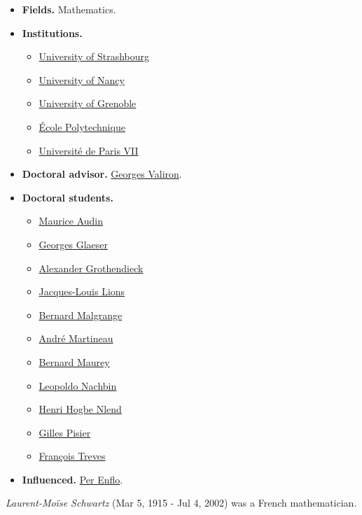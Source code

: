 \documentclass{article}
\begin{document}
\begin{itemize}
	\item \textbf{Fields.} Mathematics.
	\item \textbf{Institutions.}
	\begin{itemize}
		\item \href{https://en.wikipedia.org/wiki/University_of_Strasbourg}{University of Strashbourg}
		\item \href{https://en.wikipedia.org/wiki/University_of_Nancy}{University of Nancy}
		\item \href{https://en.wikipedia.org/wiki/University_of_Grenoble}{University of Grenoble}
		\item \href{https://en.wikipedia.org/wiki/%C3%89cole_Polytechnique}{\'Ecole Polytechnique}
		\item \href{https://en.wikipedia.org/wiki/Universit%C3%A9_de_Paris_VII}{Universit\'e de Paris VII}
	\end{itemize}
	\item \textbf{Doctoral advisor.} \href{https://en.wikipedia.org/wiki/Georges_Valiron}{Georges Valiron}.
	\item \textbf{Doctoral students.}
	\begin{itemize}
		\item \href{https://en.wikipedia.org/wiki/Maurice_Audin}{Maurice Audin}
		\item \href{https://en.wikipedia.org/wiki/Georges_Glaeser}{Georges Glaeser}
		\item \href{https://en.wikipedia.org/wiki/Alexander_Grothendieck}{Alexander Grothendieck}
		\item \href{https://en.wikipedia.org/wiki/Jacques-Louis_Lions}{Jacques-Louis Lions}
		\item \href{https://en.wikipedia.org/wiki/Bernard_Malgrange}{Bernard Malgrange}
		\item \href{https://en.wikipedia.org/wiki/Andr%C3%A9_Martineau}{Andr\'e Martineau}
		\item \href{https://en.wikipedia.org/wiki/Bernard_Maurey}{Bernard Maurey}
		\item \href{https://en.wikipedia.org/wiki/Leopoldo_Nachbin}{Leopoldo Nachbin}
		\item \href{https://en.wikipedia.org/wiki/Henri_Hogbe_Nlend}{Henri Hogbe Nlend}
		\item \href{https://en.wikipedia.org/wiki/Gilles_Pisier}{Gilles Pisier}
		\item \href{https://en.wikipedia.org/wiki/Fran%C3%A7ois_Treves}{Fran\c{c}ois Treves}
	\end{itemize}
	\item \textbf{Influenced.} \href{https://en.wikipedia.org/wiki/Per_Enflo}{Per Enflo}.
\end{itemize}
\textit{Laurent-Moïse Schwartz} (Mar 5, 1915 - Jul 4, 2002) was a French mathematician.
\end{document}
